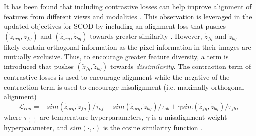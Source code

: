 It has been found that including contrastive losses can help improve alignment of features from different views and modalities \cite{karpathy2014deep,ke2024rethinking,li2021rfn,ding2022cooperative}. This observation is leveraged in the updated objectives for SCOD by including an alignment loss that pushes $(\tilde{z}_{org}, \tilde{z}_{fg})$ and $(\tilde{z}_{org}, \tilde{z}_{bg})$ towards greater similarity \cite{ding2022cooperative,wang2023connecting,liang2022mind}. However, $\tilde{z}_{fg}$ and $\tilde{z}_{bg}$ likely contain orthogonal information as the pixel information in their images are mutually exclusive. Thus, to encourage greater feature diversity, a term is introduced that pushes $(\tilde{z}_{fg}, \tilde{z}_{bg})$ towards \textit{dissimilarity}. The contraction term of contrastive losses is used to encourage alignment while the negative of the contraction term is used to encourage misalignment (i.e. maximally orthogonal alignment)
\begin{equation}
    \mathcal{L}_{con} = -sim(\tilde{z}_{org}, \tilde{z}_{fg})/\tau_{of} - sim(\tilde{z}_{org}, \tilde{z}_{bg})/\tau_{ob} + \gamma sim(\tilde{z}_{fg}, \tilde{z}_{bg})/\tau_{fb},
\end{equation}
where $\tau_{(\cdot)}$ are temperature hyperparameters, $\gamma$ is a misalignment weight hyperparameter, and $sim(\cdot,\cdot)$ is the cosine similarity function \cite{xia2015learning}.

